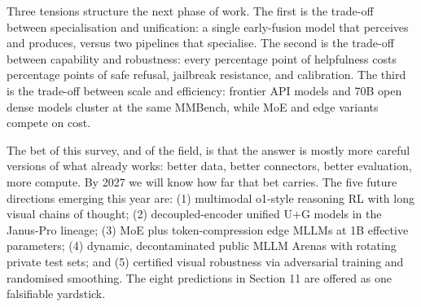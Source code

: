 \documentclass{article}
\begin{document}
Three tensions structure the next phase of work. The first is the trade-off between specialisation and unification: a single early-fusion model that perceives and produces, versus two pipelines that specialise. The second is the trade-off between capability and robustness: every percentage point of helpfulness costs percentage points of safe refusal, jailbreak resistance, and calibration. The third is the trade-off between scale and efficiency: frontier API models and 70B open dense models cluster at the same MMBench, while MoE and edge variants compete on cost.

The bet of this survey, and of the field, is that the answer is mostly more careful versions of what already works: better data, better connectors, better evaluation, more compute. By 2027 we will know how far that bet carries. The five future directions emerging this year are: (1) multimodal o1-style reasoning RL with long visual chains of thought; (2) decoupled-encoder unified U+G models in the Janus-Pro lineage; (3) MoE plus token-compression edge MLLMs at 1B effective parameters; (4) dynamic, decontaminated public MLLM Arenas with rotating private test sets; and (5) certified visual robustness via adversarial training and randomised smoothing. The eight predictions in Section 11 are offered as one falsifiable yardstick.



\end{document}
